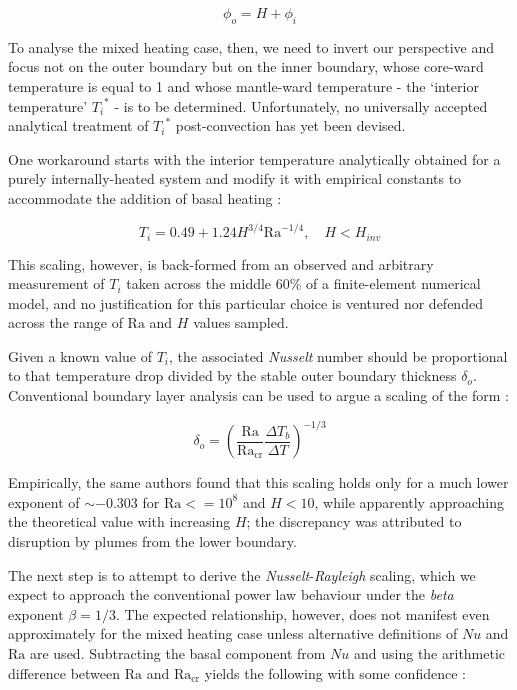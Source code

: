 \begin{equation}
{\phi}_o = H + {\phi}_i
\end{equation}

To analyse the mixed heating case, then, we need to invert our perspective and focus not on the outer boundary but on the inner boundary, whose core-ward temperature is equal to 1 and whose mantle-ward temperature - the `interior temperature' ${T_i}^{*}$ - is to be determined. Unfortunately, no universally accepted analytical treatment of ${T_i}^{*}$ post-convection has yet been devised.

One workaround starts with the interior temperature analytically obtained for a purely internally-heated system and modify it with empirical constants to accommodate the addition of basal heating \cite{Moore2008-je}:

\begin{equation}
T_i = 0.49 + 1.24 H^{3/4} {\mathrm{Ra}}^{-1/4}, \quad H < H_{inv}
\end{equation}

This scaling, however, is back-formed from an observed and arbitrary measurement of $T_i$ taken across the middle 60\% of a finite-element numerical model, and no justification for this particular choice is ventured nor defended across the range of $\mathrm{Ra}$ and $H$ values sampled.

Given a known value of $T_i$, the associated \textit{Nusselt} number should be proportional to that temperature drop divided by the stable outer boundary thickness ${\delta}_o$. Conventional boundary layer analysis can be used to argue a scaling of the form \cite{Schubert2001-ea}:

\begin{equation}
{\delta}_o = {\left( \frac{\mathrm{Ra}}{{\mathrm{Ra}}_{\mathrm{cr}}} \frac{\Delta T_b}{\Delta T} \right)}^{-1/3}
\end{equation}

Empirically, the same authors \cite{Moore2008-je} found that this scaling holds only for a much lower exponent of $\sim -0.303$ for $\mathrm{Ra}<=10^8$ and $H<10$, while apparently approaching the theoretical value with increasing $H$; the discrepancy was attributed to disruption by plumes from the lower boundary.

The next step is to attempt to derive the \textit{Nusselt}-\textit{Rayleigh} scaling, which we expect to approach the conventional power law behaviour under the \textit{beta} exponent $\beta = 1/3$. The expected relationship, however, does not manifest even approximately for the mixed heating case unless alternative definitions of $Nu$ and $\mathrm{Ra}$ are used. Subtracting the basal component from $Nu$ and using the arithmetic difference between $\mathrm{Ra}$ and ${\mathrm{Ra}}_{\mathrm{cr}}$ yields the following with some confidence \cite{Moore2008-je}:

